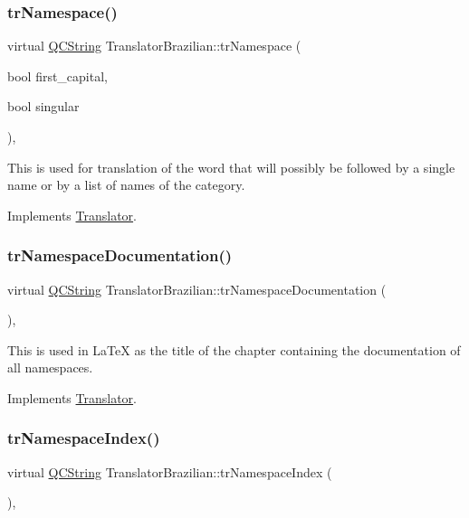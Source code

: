 \subsubsection{\texorpdfstring{trNamespace()}{trNamespace()}}
{\footnotesize\ttfamily virtual \mbox{\hyperlink{class_q_c_string}{Q\+C\+String}} Translator\+Brazilian\+::tr\+Namespace (\begin{DoxyParamCaption}\item[{bool}]{first\+\_\+capital,  }\item[{bool}]{singular }\end{DoxyParamCaption})\hspace{0.3cm}{\ttfamily [inline]}, {\ttfamily [virtual]}}

This is used for translation of the word that will possibly be followed by a single name or by a list of names of the category. 

Implements \mbox{\hyperlink{class_translator}{Translator}}.

\mbox{\label{class_translator_brazilian_ad864babf32097f8a64b7544b12bae59d}} 
\subsubsection{\texorpdfstring{trNamespaceDocumentation()}{trNamespaceDocumentation()}}
{\footnotesize\ttfamily virtual \mbox{\hyperlink{class_q_c_string}{Q\+C\+String}} Translator\+Brazilian\+::tr\+Namespace\+Documentation (\begin{DoxyParamCaption}{ }\end{DoxyParamCaption})\hspace{0.3cm}{\ttfamily [inline]}, {\ttfamily [virtual]}}

This is used in La\+TeX as the title of the chapter containing the documentation of all namespaces. 

Implements \mbox{\hyperlink{class_translator}{Translator}}.

\mbox{\label{class_translator_brazilian_ab366f0d6979d88a32e5a6eef516f89b3}} 
\subsubsection{\texorpdfstring{trNamespaceIndex()}{trNamespaceIndex()}}
{\footnotesize\ttfamily virtual \mbox{\hyperlink{class_q_c_string}{Q\+C\+String}} Translator\+Brazilian\+::tr\+Namespace\+Index (\begin{DoxyParamCaption}{ }\end{DoxyParamCaption})\hspace{0.3cm}{\ttfamily [inline]}, {\ttfamily [virtual]}}


